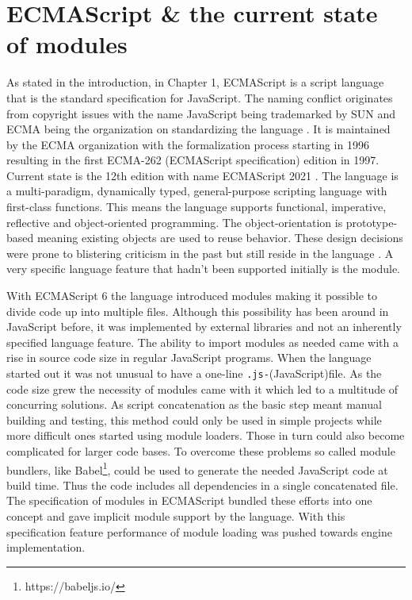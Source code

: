 \section{ECMAScript \& the current state of modules}
As stated in the introduction, in Chapter 1, ECMAScript is a script language that is the standard specification for JavaScript. The naming conflict originates from copyright issues with the name JavaScript being trademarked by SUN and ECMA being the organization on standardizing the language \cite{10.1145/3386327}. It is maintained by the ECMA organization with the formalization process starting in 1996 resulting in the first ECMA-262 (ECMAScript specification) edition in 1997. Current state is the 12th edition with name ECMAScript 2021 \cite{ecma}. The language is a multi-paradigm, dynamically typed, general-purpose scripting language with first-class functions. This means the language supports functional, imperative, reflective and object-oriented programming. The object-orientation is prototype-based meaning existing objects are used to reuse behavior. These design decisions were prone to blistering criticism in the past but still reside in the language \cite{10.1145/3386327}. A very specific language feature that hadn't been supported initially is the module.

With ECMAScript 6 the language introduced modules making it possible to divide code up into multiple files. Although this possibility has been around in JavaScript before, it was implemented by external libraries and not an inherently specified language feature. The ability to import modules as needed came with a rise in source code size in regular JavaScript programs. When the language started out it was not unusual to have a one-line \texttt{.js-}(JavaScript)file. As the code size grew the necessity of modules came with it which led to a multitude of concurring solutions. As script concatenation as the basic step meant manual building and testing, this method could only be used in simple projects while more difficult ones started using module loaders. Those in turn could also become complicated for larger code bases. To overcome these problems so called module bundlers, like Babel\footnote{https://babeljs.io/}, could be used to generate the needed JavaScript code at build time. Thus the code includes all dependencies in a single concatenated file. The specification of modules in ECMAScript bundled these efforts into one concept and gave implicit module support by the language. With this specification feature performance of module loading was pushed towards engine implementation.

